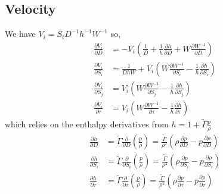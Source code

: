 \documentclass{article}
\begin{document}
\subsection{Velocity}
We have $V_i = S_i D^{-1}h^{-1}W^{-1}$ so,
\begin{align*}
  \frac{\partial V_i}{\partial D} &= -V_i \left(\frac{1}{D} + \frac{1}{h} \frac{\partial h}{\partial D} + W \frac{\partial W^{-1}}{\partial D}\right)\\
  \frac{\partial V_i}{\partial S_i} &= \frac{1}{DhW} + V_i \left(W\frac{\partial W^{-1}}{\partial S_i} - \frac{1}{h}\frac{\partial h}{\partial S_i}\right)\\
  \frac{\partial V_i}{\partial S_j} &= V_i \left(W\frac{\partial W^{-1}}{\partial S_j} - \frac{1}{h}\frac{\partial h}{\partial S_j}\right)\\
  \frac{\partial V_i}{\partial \tau} &= V_i \left(W\frac{\partial W^{-1}}{\partial \tau} - \frac{1}{h}\frac{\partial h}{\partial \tau}\right)
\end{align*}
which relies on the enthalpy derivatives from $h = 1 + \widetilde{\Gamma}\frac{p}{\rho}$
\begin{align*}
  \frac{\partial h}{\partial D} &= \widetilde{\Gamma}\frac{\partial}{\partial D}\left(\frac{p}{\rho}\right) = \frac{\widetilde{\Gamma}}{\rho^2}\left(\rho\frac{\partial p}{\partial D} - p\frac{\partial \rho}{\partial D}\right) \\
  \frac{\partial h}{\partial S_i} &= \widetilde{\Gamma}\frac{\partial}{\partial S_i}\left(\frac{p}{\rho}\right) = \frac{\widetilde{\Gamma}}{\rho^2}\left(\rho\frac{\partial p}{\partial S_i} - p\frac{\partial \rho}{\partial S_i}\right) \\
  \frac{\partial h}{\partial \tau} &= \widetilde{\Gamma}\frac{\partial}{\partial \tau}\left(\frac{p}{\rho}\right) = \frac{\widetilde{\Gamma}}{\rho^2}\left(\rho\frac{\partial p}{\partial \tau} - p\frac{\partial \rho}{\partial \tau}\right)
\end{align*}
\end{document}
